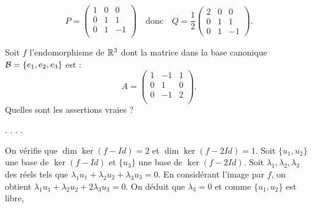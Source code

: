 \begin{question}
\begin{explanations}
$$P= \left(\begin{array}{rcc}
1&0&0\\
0&1&1\\ 
0&1&-1\\
\end{array}\right)\quad \mbox{donc}\quad Q= \frac{1}{2}\left(\begin{array}{rcc}
2&0&0\\
0&1&1\\ 
0&1&-1\end{array}\right).$$
\end{explanations}
\end{question}





\begin{question}
Soit $f$ l'endomorphisme de $\mathbb{R}^3$ dont la matrice dans la base canonique ${\cal B}=\{e_1,e_2,e_3\}$ est : 
$$A = \left(\begin{array}{rcc}
1&-1&1\\
0&1&0\\ 
0&-1&2\\
\end{array}\right).$$
Quelles sont les assertions vraies ?
\begin{answers}  
.
.
.
.
\end{answers}
\begin{explanations} On vérifie que $\dim \ker (f-Id) = 2 $ et $\dim \ker (f-2Id) = 1 $. Soit $\{u_1,u_2\}$ une base de $\ker (f-Id)$ et  $\{u_3\}$ une base de $\ker (f-2Id)$.
\vskip0mm
Soit $\lambda_1, \lambda_2,\lambda_3$ des réels tels que $\lambda_1u_1+\lambda_2u_2+\lambda_3u_3=0$. En considérant l'image par $f$, on obtient $\lambda_1u_1+\lambda_2u_2+2\lambda_3u_3=0$. On déduit que $\lambda_3=0$ et comme $\{u_1,u_2\}$  est libre, 

\end{explanations}
\end{question}
